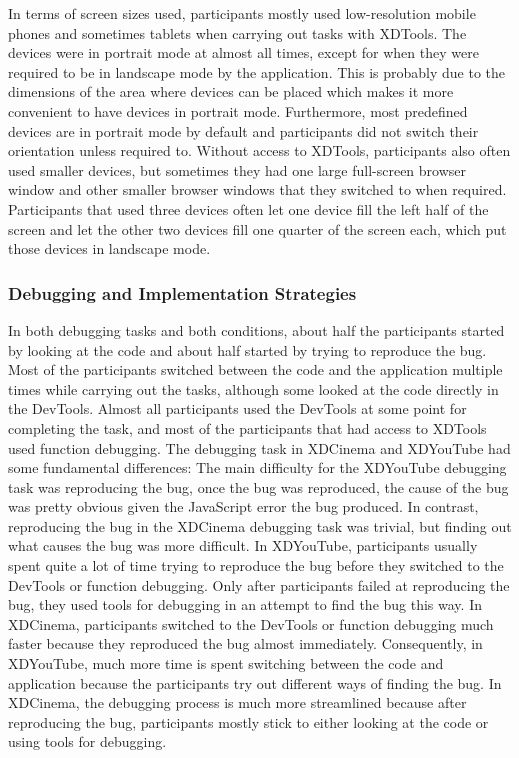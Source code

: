 In terms of screen sizes used, participants mostly used low-resolution mobile phones and sometimes tablets when carrying out tasks with XDTools. The devices were in portrait mode at almost all times, except for when they were required to be in landscape mode by the application. This is probably due to the dimensions of the area where devices can be placed which makes it more convenient to have devices in portrait mode. Furthermore, most predefined devices are in portrait mode by default and participants did not switch their orientation unless required to. Without access to XDTools, participants also often used smaller devices, but sometimes they had one large full-screen browser window and other smaller browser windows that they switched to when required. Participants that used three devices often let one device fill the left half of the screen and let the other two devices fill one quarter of the screen each, which put those devices in landscape mode. 

\subsubsection{Debugging and Implementation Strategies}

In both debugging tasks and both conditions, about half the participants started by looking at the code and about half started by trying to reproduce the bug. Most of the participants switched between the code and the application multiple times while carrying out the tasks, although some looked at the code directly in the DevTools. Almost all participants used the DevTools at some point for completing the task, and most of the participants that had access to XDTools used function debugging. The debugging task in XDCinema and XDYouTube had some fundamental differences: The main difficulty for the XDYouTube debugging task was reproducing the bug, once the bug was reproduced, the cause of the bug was pretty obvious given the JavaScript error the bug produced. In contrast, reproducing the bug in the XDCinema debugging task was trivial, but finding out what causes the bug was more difficult. In XDYouTube, participants usually spent quite a lot of time trying to reproduce the bug before they switched to the DevTools or function debugging. Only after participants failed at reproducing the bug, they used tools for debugging in an attempt to find the bug this way. In XDCinema, participants switched to the DevTools or function debugging much faster because they reproduced the bug almost immediately. Consequently, in XDYouTube, much more time is spent switching between the code and application because the participants try out different ways of finding the bug. In XDCinema, the debugging process is much more streamlined because after reproducing the bug, participants mostly stick to either looking at the code or using tools for debugging.

